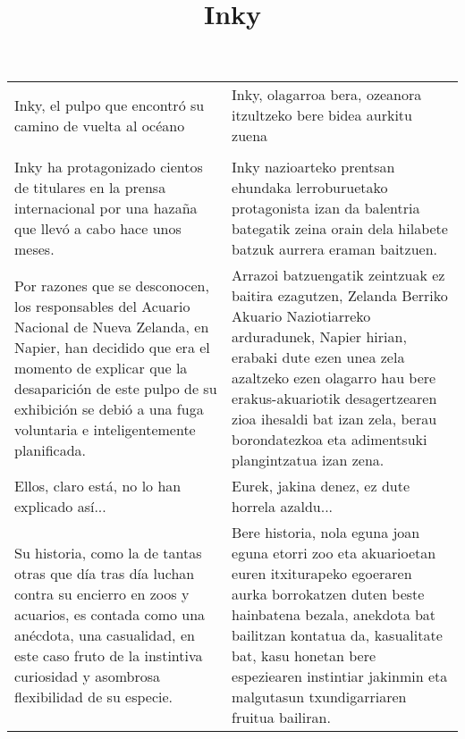 \documentclass{article}
\title{Inky}
\author{}
\date{}
\begin{document}
\maketitle


\begin{center}
\begin{longtable}{|p{6cm}|p{6cm}|}
  \toprule
  \cellcolor{lightgray}{\textbf{Título}} &
  \cellcolor{lightgray}{\textbf{Izenburua}}\\
  
  \midrule
  Inky, el pulpo que encontró su camino de vuelta al océano&
  Inky, olagarroa bera, ozeanora itzultzeko bere bidea aurkitu zuena\\

  \midrule
  \cellcolor{lightgray}{\textbf{Párrafo}} &
  \cellcolor{lightgray}{\textbf{Paragrafoa}}\\
  
  \midrule
  Inky ha protagonizado cientos de titulares en la prensa internacional por una hazaña que llevó a cabo hace unos meses.&
  Inky nazioarteko prentsan ehundaka lerroburuetako protagonista izan da balentria bategatik zeina orain dela hilabete batzuk aurrera eraman baitzuen.\\

  \midrule
  Por razones que se desconocen, los responsables del Acuario Nacional de Nueva Zelanda, en Napier, han decidido que era el momento de explicar que la desaparición de este pulpo de su exhibición se debió a una fuga voluntaria e inteligentemente planificada.&
  Arrazoi batzuengatik zeintzuak ez baitira ezagutzen, Zelanda Berriko Akuario Naziotiarreko arduradunek, Napier hirian, erabaki dute ezen unea zela azaltzeko ezen olagarro hau bere erakus-akuariotik desagertzearen zioa ihesaldi bat izan zela, berau borondatezkoa eta adimentsuki plangintzatua izan zena.\\

  \midrule
  Ellos, claro está, no lo han explicado así...&
  Eurek, jakina denez, ez dute horrela azaldu...\\

  \midrule
  Su historia, como la de tantas otras que día tras día luchan contra su encierro en zoos y acuarios, es contada como una anécdota, una casualidad, en este caso fruto de la instintiva curiosidad y asombrosa flexibilidad de su especie.&
  Bere historia, nola eguna joan eguna etorri zoo eta akuarioetan euren itxiturapeko egoeraren aurka borrokatzen duten beste hainbatena bezala, anekdota bat bailitzan kontatua da, kasualitate bat, kasu honetan bere espeziearen instintiar jakinmin eta malgutasun txundigarriaren fruitua bailiran.\\


\end{longtable}
\end{center}
\end{document}
